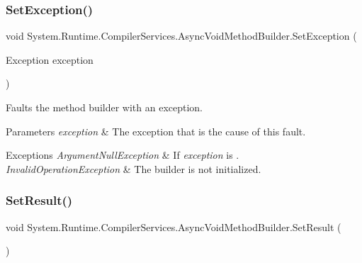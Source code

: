 \subsubsection{\texorpdfstring{Set\+Exception()}{SetException()}}
{\footnotesize\ttfamily void System.\+Runtime.\+Compiler\+Services.\+Async\+Void\+Method\+Builder.\+Set\+Exception (\begin{DoxyParamCaption}\item[{Exception}]{exception }\end{DoxyParamCaption})\hspace{0.3cm}{\ttfamily [inline]}}



Faults the method builder with an exception.


\begin{DoxyParams}{Parameters}
{\em exception} & The exception that is the cause of this fault.\\
\hline
\end{DoxyParams}

\begin{DoxyExceptions}{Exceptions}
{\em Argument\+Null\+Exception} & If {\itshape exception}  is . \\
\hline
{\em Invalid\+Operation\+Exception} & The builder is not initialized.\\
\hline
\end{DoxyExceptions}
\mbox{\label{struct_system_1_1_runtime_1_1_compiler_services_1_1_async_void_method_builder_acef1f52e68e094163859f1d3a891a9af}} 
\subsubsection{\texorpdfstring{Set\+Result()}{SetResult()}}
{\footnotesize\ttfamily void System.\+Runtime.\+Compiler\+Services.\+Async\+Void\+Method\+Builder.\+Set\+Result (\begin{DoxyParamCaption}{ }\end{DoxyParamCaption})\hspace{0.3cm}{\ttfamily [inline]}}



